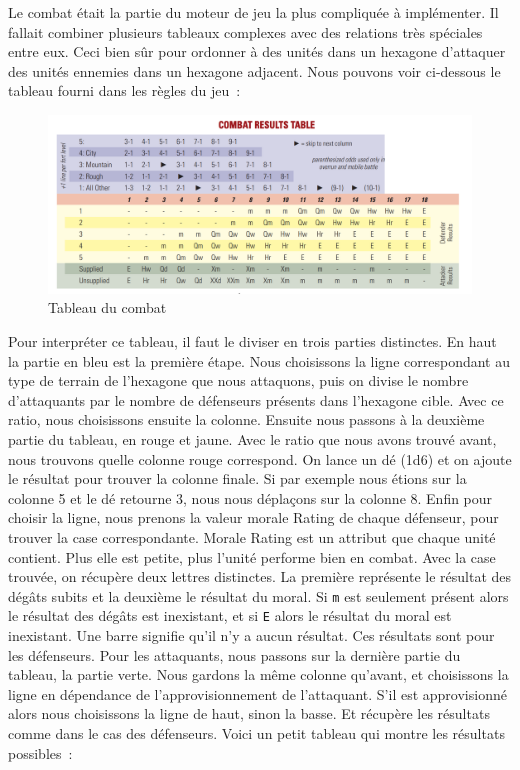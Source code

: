 Le combat était la partie du moteur de jeu la plus compliquée à implémenter.
Il fallait combiner plusieurs tableaux complexes avec des relations très spéciales entre eux.
Ceci bien sûr pour ordonner à des unités dans un hexagone d'attaquer des unités ennemies dans un hexagone adjacent.
Nous pouvons voir ci-dessous le tableau fourni dans les règles du jeu :

\begin{figure}[H]
\centering
\includegraphics[scale=0.25]{data/tableau_combat.png}
\caption{Tableau du combat}
\end{figure}

Pour interpréter ce tableau, il faut le diviser en trois parties distinctes. En haut la partie en bleu est la première étape.
Nous choisissons la ligne correspondant au type de terrain de l'hexagone que nous attaquons, puis on divise le nombre
d'attaquants par le nombre de défenseurs présents dans l'hexagone cible. Avec ce ratio, nous choisissons ensuite la colonne.
Ensuite nous passons à la deuxième partie du tableau, en rouge et jaune. Avec le ratio que nous avons trouvé avant,
nous trouvons quelle colonne rouge correspond. On lance un dé (1d6) et on ajoute le résultat pour trouver la colonne finale.
Si par exemple nous étions sur la colonne 5 et le dé retourne 3, nous nous déplaçons sur la colonne 8.
Enfin pour choisir la ligne, nous prenons la valeur morale Rating de chaque défenseur, pour trouver la case correspondante.
Morale Rating est un attribut que chaque unité contient. Plus elle est petite, plus l'unité performe bien en combat.
Avec la case trouvée, on récupère deux lettres distinctes. La première représente le résultat des dégâts subits et la deuxième le résultat du moral.
Si {\tt m} est seulement présent alors le résultat des dégâts est inexistant, et si {\tt E} alors le résultat du moral est inexistant.
Une barre signifie qu'il n'y a aucun résultat. Ces résultats sont pour les défenseurs.
Pour les attaquants, nous passons sur la dernière partie du tableau, la partie verte.
Nous gardons la même colonne qu'avant, et choisissons la ligne en dépendance de l'approvisionnement de l'attaquant.
S'il est approvisionné alors nous choisissons la ligne de haut, sinon la basse. Et récupère les résultats comme dans le cas des défenseurs.
Voici un petit tableau qui montre les résultats possibles :

